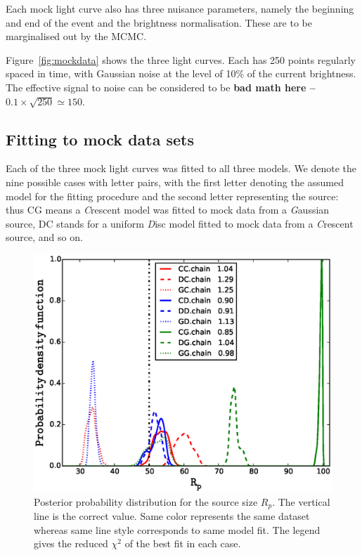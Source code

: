 Each mock light curve also has three nuisance parameters, namely the
beginning and end of the event and the brightness normalisation.
These are to be marginalised out by the MCMC.

Figure~\ref{fig:mockdata} shows the three light curves.  Each has
250 points regularly spaced in time, with Gaussian noise at the level
of 10\% of the current brightness.  The effective signal to noise can
be considered to be \textbf{ bad math here -- $0.1\times\sqrt{250}\simeq150$}.



\subsection{Fitting to mock data sets}

Each of the three mock light curves was fitted to all three models.
We denote the nine possible cases with letter pairs, with the first
letter denoting the assumed model for the fitting procedure and 
the second letter representing
the source: thus CG means a {\em C\/}rescent model was fitted to mock
data from a {\em G\/}aussian source, DC stands for a uniform {\em
  D\/}isc model fitted to mock data from a {\em C\/}rescent source,
and so on.

\begin{figure}
\centering
  \includegraphics[width=0.9\hsize,bb=0 0 576 432
                  ]{plots/Rp4all.eps}
\caption{\label{fig:mcmc} Posterior probability distribution for the
  source size $R_p$.  The vertical line is the correct value. Same
  color represents the same dataset whereas same line style
  corresponds to same model fit.  The legend gives the reduced
  $\chi^2$ of the best fit in each case.}
\end{figure}

